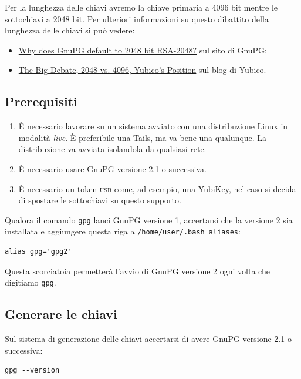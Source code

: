 \documentclass[a4paper,10pt]{article}
\begin{document}
Per la lunghezza delle chiavi avremo la chiave primaria a 4096 bit mentre le sottochiavi a 2048 bit. Per ulteriori informazioni su questo dibattito della lunghezza delle chiavi si può vedere:

\begin{itemize}
 \item \href{https://www.gnupg.org/faq/gnupg-faq.html#default_rsa2048}{Why does GnuPG default to 2048 bit RSA-2048?} sul sito di GnuPG;
 \item \href{https://www.yubico.com/2015/02/big-debate-2048-4096-yubicos-stand/}{The Big Debate, 2048 vs. 4096, Yubico’s Position} sul blog di Yubico.
\end{itemize}

\subsection{Prerequisiti}

\begin{enumerate}
 \item È necessario lavorare su un sistema avviato con una distribuzione Linux in modalità \textit{live}. È preferibile una \href{https://tails.boum.org/index.it.html}{Tails}, ma va bene una qualunque. La distribuzione va avviata isolandola da qualsiasi rete.
 \item È necessario usare GnuPG versione 2.1 o successiva.
 \item È necessario un token \textsc{usb} come, ad esempio, una YubiKey, nel caso si decida di spostare le sottochiavi su questo supporto.
\end{enumerate}

Qualora il comando \texttt{gpg} lanci GnuPG versione 1, accertarsi che la versione 2 sia installata e aggiungere questa riga a \texttt{/home/user/.bash\_aliases}:

\begin{lstlisting}
alias gpg='gpg2'
\end{lstlisting}

Questa scorciatoia permetterà l'avvio di GnuPG versione 2 ogni volta che digitiamo \texttt{gpg}.

\subsection{Generare le chiavi}

Sul sistema di generazione delle chiavi accertarsi di avere GnuPG versione 2.1 o successiva:

\begin{lstlisting}
gpg --version
\end{lstlisting}
\end{document}
